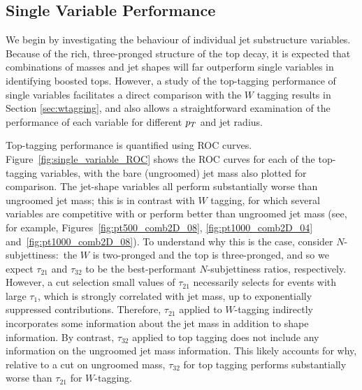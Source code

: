 \subsection{Single Variable Performance}\label{sec:single_variable}
We begin by investigating the behaviour of individual jet substructure variables. Because of the rich, three-pronged structure of the top decay, it is expected that combinations of masses and jet shapes will far outperform single variables in identifying boosted tops. However, a study of the top-tagging performance of single variables facilitates a direct comparison with the $W$ tagging results in Section \ref{sec:wtagging}, and also allows a straightforward examination of the performance of each variable for different $p_T$ and jet radius.

Top-tagging performance is quantified using ROC curves. Figure~\ref{fig:single_variable_ROC} shows the ROC curves for each of the top-tagging variables, with the bare (ungroomed) jet mass also plotted for comparison. The jet-shape variables all perform substantially worse than ungroomed jet mass; this is in contrast with $W$ tagging, for which several variables are competitive with or perform better than ungroomed jet mass (see, for example, Figures~\ref{fig:pt500_comb2D_08}, \ref{fig:pt1000_comb2D_04} and~\ref{fig:pt1000_comb2D_08}).
To understand why this is the case, consider $N$-subjettiness:~the $W$ is two-pronged and the top is three-pronged, and so we expect $\tau_{21}$ and $\tau_{32}$ to be the best-performant $N$-subjettiness ratios, respectively. However, a cut selection small values of $\tau_{21}$ necessarily selects for events with large $\tau_1$, which is strongly correlated with jet mass, up to exponentially suppressed contributions. Therefore, $\tau_{21}$ applied to $W$-tagging indirectly incorporates some information about the jet mass in addition to shape information. By contrast, $\tau_{32}$ applied to top tagging does not include any information on the ungroomed jet mass information.  This likely accounts for why, relative to a cut on ungroomed mass, $\tau_{32}$ for top tagging performs substantially worse than $\tau_{21}$ for $W$-tagging. 


